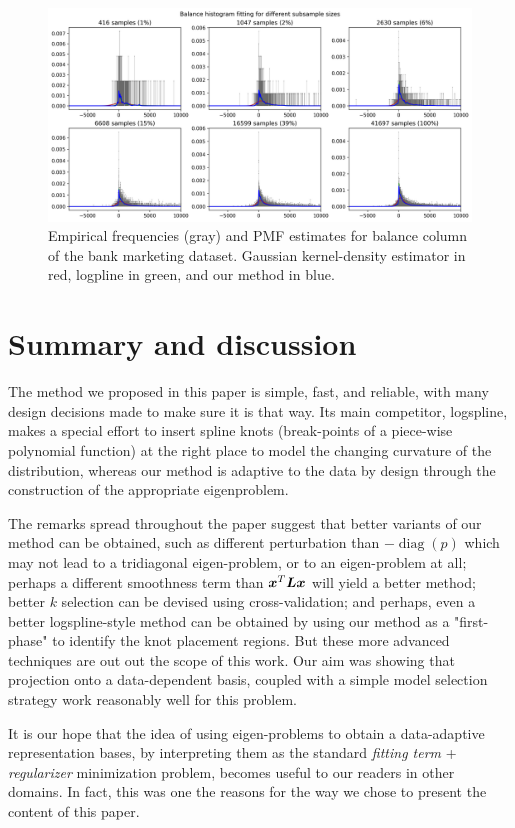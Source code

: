 \documentclass[10pt]{article} %
\DeclareMathOperator{\diag}{diag}
\begin{document}
\begin{figure}
    \centering
    \includegraphics[width=\linewidth]{bank_balance.png}
    \caption{Empirical frequencies (gray) and PMF estimates for balance column of the bank marketing dataset. Gaussian kernel-density estimator in red, logpline in green, and our method in blue.}
    \label{fig:bank_balance}
\end{figure}


\section{Summary and discussion}
The method we proposed in this paper is simple, fast, and reliable, with many design decisions made to make sure it is that way. Its main competitor, logspline, makes a special effort to insert spline knots (break-points of a piece-wise polynomial function) at the right place to model the changing curvature of the distribution, whereas our method is adaptive to the data by design through the construction of the appropriate eigenproblem. 

The remarks spread throughout the paper suggest that better variants of our method can be obtained, such as different perturbation than $-\diag(p)$ which may not lead to a tridiagonal eigen-problem, or to an eigen-problem at all; perhaps a  different smoothness term than ${\bm{x}}^T {\bm{L}} {\bm{x}}$ will yield a better method; better $k$ selection can be devised using cross-validation; and perhaps, even a better logspline-style method can be obtained by using our method as a "first-phase" to identify the knot placement regions. But these more advanced techniques are out out the scope of this work. Our aim was showing that projection onto a data-dependent basis, coupled with a simple model selection strategy work reasonably well for this problem.

It is our hope that the idea of using eigen-problems to obtain a data-adaptive representation bases, by interpreting them as the standard \emph{fitting term} + \emph{regularizer} minimization problem, becomes useful to our readers in other domains. In fact, this was one the reasons for the way we chose to present the content of this paper.



\end{document}

